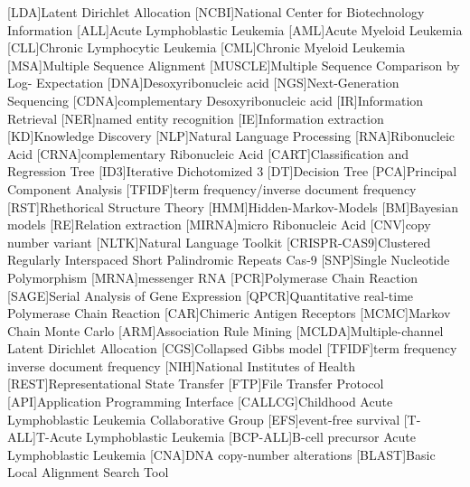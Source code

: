 \begin{acronym}[TFIDF]
[LDA]{Latent Dirichlet Allocation}
[NCBI]{National Center for Biotechnology Information}
[ALL]{Acute Lymphoblastic Leukemia}
[AML]{Acute Myeloid Leukemia}
[CLL]{Chronic Lymphocytic Leukemia}
[CML]{Chronic Myeloid Leukemia}
[MSA]{Multiple Sequence Alignment}
[MUSCLE]{Multiple Sequence Comparison by Log- Expectation}
[DNA]{Desoxyribonucleic acid}
[NGS]{Next-Generation Sequencing}
[CDNA]{complementary Desoxyribonucleic acid}
[IR]{Information Retrieval}
[NER]{named entity recognition}
[IE]{Information extraction}
[KD]{Knowledge Discovery}
[NLP]{Natural Language Processing}
[RNA]{Ribonucleic Acid}
[CRNA]{complementary Ribonucleic Acid}
[CART]{Classification and Regression Tree}
[ID3]{Iterative Dichotomized 3}
[DT]{Decision Tree}
[PCA]{Principal Component Analysis}
[TFIDF]{term frequency/inverse document frequency}
[RST]{Rhethorical Structure Theory}
[HMM]{Hidden-Markov-Models}
[BM]{Bayesian models}
[RE]{Relation extraction}
[MIRNA]{micro Ribonucleic Acid}
[CNV]{copy number variant}
[NLTK]{Natural Language Toolkit}
[CRISPR-CAS9]{Clustered Regularly Interspaced Short Palindromic Repeats Cas-9}
[SNP]{Single Nucleotide Polymorphism}
[MRNA]{messenger RNA}
[PCR]{Polymerase Chain Reaction}
[SAGE]{Serial Analysis of Gene Expression}
[QPCR]{Quantitative real-time Polymerase Chain Reaction}
[CAR]{Chimeric Antigen Receptors}
[MCMC]{Markov Chain Monte Carlo}
[ARM]{Association Rule Mining}
[MCLDA]{Multiple-channel Latent Dirichlet Allocation}
[CGS]{Collapsed Gibbs model}
[TFIDF]{term frequency inverse document frequency}
[NIH]{National Institutes of Health}
[REST]{Representational State Transfer}
[FTP]{File Transfer Protocol}
[API]{Application Programming Interface}
[CALLCG]{Childhood Acute Lymphoblastic Leukemia Collaborative Group}
[EFS]{event-free survival}
[T-ALL]{T-Acute Lymphoblastic Leukemia}
[BCP-ALL]{B-cell precursor Acute Lymphoblastic Leukemia}
[CNA]{DNA copy-number alterations}
[BLAST]{Basic Local Alignment Search Tool}
\end{acronym}


